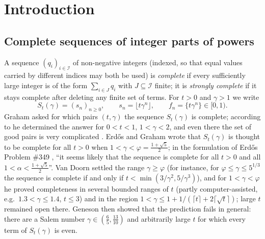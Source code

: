 \documentclass[11pt]{amsart}
\theoremstyle{definition}
\theoremstyle{remark}
\newcommand{\fl}[1]{\lfloor #1\rfloor}
\newcommand{\fr}[1]{\{#1\}}
\begin{document}
\maketitle

\tableofcontents

\section{Introduction}\label{sec:intro}

\subsection{Complete sequences of integer parts of powers}
A sequence $(q_i)_{i\in\mathcal I}$ of non-negative integers (indexed, so that equal
values carried by different indices may both be used) is \emph{complete} if every
sufficiently large integer is of the form $\sum_{i\in J}q_i$ with $J\subseteq\mathcal I$
finite; it is \emph{strongly complete} if it stays complete after deleting any finite set
of terms. For $t>0$ and $\gamma>1$ we write
\[
  S_t(\gamma)=(s_n)_{n\ge 0},\qquad s_n=\fl{t\gamma^n},\qquad f_n=\fr{t\gamma^n}\in[0,1).
\]
Graham asked for which pairs $(t,\gamma)$ the sequence $S_t(\gamma)$ is complete; according to
\cite{vD26} he determined the answer for $0<t<1$, $1<\gamma<2$, and even there the set of good
pairs is very complicated \cite{EP349}. Erd\H{o}s and Graham \cite[p.~57]{EG80} wrote that
$S_t(\gamma)$ is thought to be complete for all $t>0$ when $1<\gamma<\varphi=\frac{1+\sqrt5}2$;
in the formulation of Erd\H{o}s Problem \#349 \cite{EP349}, ``it seems likely that the
sequence is complete for all $t>0$ and all $1<\alpha<\frac{1+\sqrt5}{2}$''. Van Doorn
\cite{vD26} settled the range $\gamma\ge\varphi$ (for instance, for
$\varphi\le\gamma\le5^{1/3}$ the sequence is complete if and only if
$t<\min(3/\gamma^2,5/\gamma^3)$), and for $1<\gamma<\varphi$ he proved completeness in several
bounded ranges of $t$ (partly computer-assisted, e.g.\ $1.3<\gamma\le1.4$, $t\le3$) and in the
region $1<\gamma\le1+1/(\lceil t\rceil+2\lceil\sqrt t\rceil)$; large $t$ remained open there.
Geneson \cite[Theorem~9]{Gen26} then showed that the prediction fails in general: there are a
Salem number $\gamma\in(\frac65,\frac{13}{10})$ and arbitrarily large $t$ for which every term of
$S_t(\gamma)$ is even.
\end{document}

